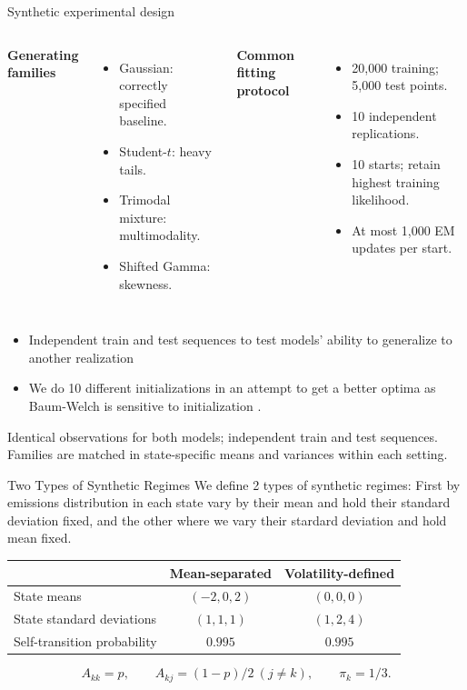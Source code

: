 \begin{frame}{Synthetic experimental design}
\begin{columns}[T,onlytextwidth]
\textbf{Generating families}
\begin{itemize}
\item Gaussian: correctly specified baseline.
\item Student-$t$: heavy tails.
\item Trimodal mixture: multimodality.
\item Shifted Gamma: skewness.
\end{itemize}
\textbf{Common fitting protocol}
\begin{itemize}
\item 20,000 training; 5,000 test points.
\item 10 independent replications.
\item 10 starts; retain highest training likelihood.
\item At most 1,000 EM updates per start.
\end{itemize}
\end{columns}
\vspace{0.25cm}
\begin{itemize}
    \item Independent train and test sequences to test models' ability to generalize to another realization
    \item We do 10 different initializations in an attempt to get a better optima as Baum-Welch is sensitive to initialization \cite{rabiner1989}.
\end{itemize}
Identical observations for both models; independent train and test sequences.
Families are matched in state-specific means and variances within each setting.
\end{frame}

\begin{frame}{Two Types of Synthetic Regimes}
We define 2 types of synthetic regimes: First by emissions distribution in each state vary by their mean and hold their standard deviation fixed, and the other where we vary their stardard deviation and hold mean fixed.

\centering
\begin{tabular}{lcc}
\toprule
 & Mean-separated & Volatility-defined \\
\midrule
State means & $(-2,0,2)$ & $(0,0,0)$ \\
State standard deviations & $(1,1,1)$ & $(1,2,4)$ \\
Self-transition probability & $0.995$ & $0.995$ \\
\bottomrule
\end{tabular}\par
\[
A_{kk}=p,\qquad A_{kj}=(1-p)/2\ (j\ne k),\qquad \pi_k=1/3.
\]
\end{frame}

